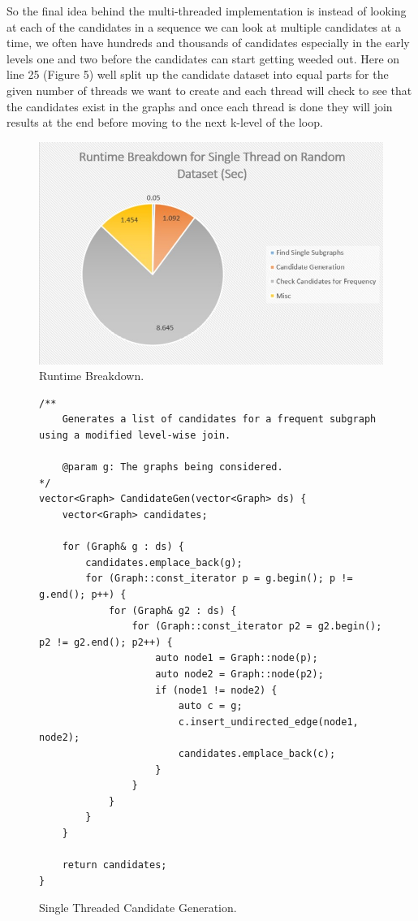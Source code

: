 \documentclass{article}
\begin{document}
So the final idea behind the multi-threaded implementation is instead of looking at each of the candidates in a sequence we can look at multiple candidates at a time, we often have hundreds and thousands of candidates especially in the early levels one and two before the candidates can start getting weeded out. Here on line 25 (Figure 5) well split up the candidate dataset into equal parts for the given number of threads we want to create and each thread will check to see that the candidates exist in the graphs and once each thread is done they will join results at the end before moving to the next k-level of the loop.

\begin{figure}
  \includegraphics[width=\linewidth]{Figure2.jpg}
  \caption{Runtime Breakdown.}
  \label{fig:Runtime Breakdown}
\end{figure}

\begin{figure}
\begin{lstlisting}
/**
	Generates a list of candidates for a frequent subgraph using a modified level-wise join.

	@param g: The graphs being considered.	
*/
vector<Graph> CandidateGen(vector<Graph> ds) {
	vector<Graph> candidates;

	for (Graph& g : ds) {
		candidates.emplace_back(g);
		for (Graph::const_iterator p = g.begin(); p != g.end(); p++) {
			for (Graph& g2 : ds) {
				for (Graph::const_iterator p2 = g2.begin(); p2 != g2.end(); p2++) {
					auto node1 = Graph::node(p);
					auto node2 = Graph::node(p2);
					if (node1 != node2) {
						auto c = g;
						c.insert_undirected_edge(node1, node2);
						candidates.emplace_back(c);
					}
				}
			}
		}
	}

	return candidates;
}
\end{lstlisting}
  \caption{Single Threaded Candidate Generation.}
  \label{fig:Single Threaded Candidate Generation}
\end{figure}
\end{document}
